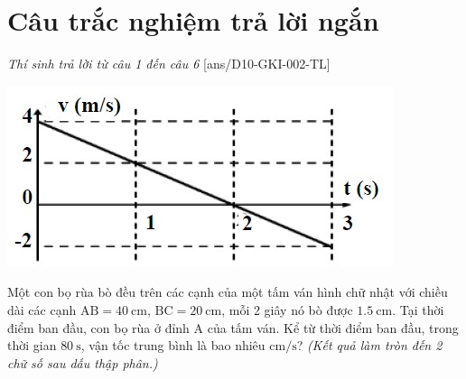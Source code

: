 \section{Câu trắc nghiệm trả lời ngắn} \textit{Thí sinh trả lời từ câu 1 đến câu 6}
\setcounter{ex}{0}
[ans/D10-GKI-002-TL]
\begin{ex}
	{\includegraphics[width=0.55\linewidth]{../figs/D10-2-13}}
	\loigiai{
		
	}
\end{ex}
\begin{ex}
	Một con bọ rùa bò đều trên các cạnh của một tấm ván hình chữ nhật với chiều dài các cạnh $\mathrm{AB}=\SI{40}{\centi\meter}$, $\mathrm{BC}=\SI{20}{\centi\meter}$, mỗi 2 giây nó bò được $\SI{1.5}{\centi\meter}$. Tại thời điểm ban đầu, con bọ rùa ở đỉnh A của tấm ván. Kể từ thời điểm ban đầu, trong thời gian $\SI{80}{\second}$, vận tốc trung bình là bao nhiêu $\si{\centi\meter/\second}$? \textit{(Kết quả làm tròn đến 2 chữ số sau dấu thập phân.)}
\end{ex}
